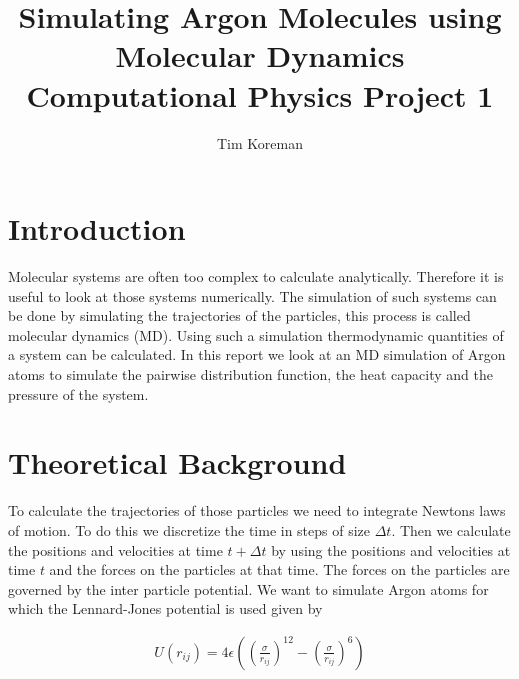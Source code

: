 \documentclass[10 pt, a4paper]{article}
\title{
 Simulating Argon Molecules using Molecular Dynamics \\
  \Large Computational Physics Project 1
}
\author{Tim Koreman }
\date{}
\begin{document}
\maketitle



\section{Introduction}

Molecular systems are often too complex to calculate analytically. Therefore it is useful to look  at those systems numerically. The simulation of such systems can be done by simulating the trajectories of the particles, this process is called molecular dynamics (MD). Using such a simulation thermodynamic quantities of a system can be calculated. In this report we look at an MD simulation of Argon atoms to simulate the pairwise distribution function, the heat capacity and the pressure of the system.

\section{Theoretical Background} \label{sec:theo}

To calculate the trajectories of those particles we need to integrate Newtons laws of motion. To do this we discretize the time in steps of size $\Delta t$. Then we calculate the positions and velocities at time $t + \Delta t$ by using the positions and velocities at time $t$ and the forces on the particles at that time. The forces on the particles are governed by the inter particle potential. We want to simulate Argon atoms for which the Lennard-Jones potential is used  given by

\begin{align}
U(r_{ij}) = 4 \epsilon \left( \left( \frac{\sigma}{r_{ij}} \right)^{12} - \left( \frac{\sigma}{r_{ij}} \right)^{6} \right)
\end{align}
\end{document}
